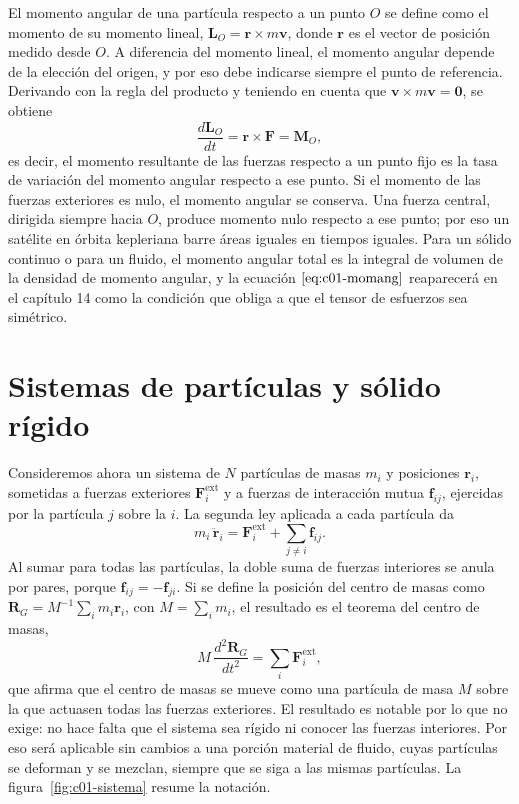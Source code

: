 \documentclass[10pt,openany]{book}
\begin{document}
El momento angular de una partícula respecto a un punto \(O\) se define como el momento de su momento lineal, \(\mathbf{L}_O = \mathbf{r}\times m\mathbf{v}\), donde \(\mathbf{r}\) es el vector de posición medido desde \(O\). A diferencia del momento lineal, el momento angular depende de la elección del origen, y por eso debe indicarse siempre el punto de referencia. Derivando con la regla del producto y teniendo en cuenta que \(\mathbf{v}\times m\mathbf{v} = \mathbf{0}\), se obtiene
\begin{equation}
\frac{d\mathbf{L}_O}{dt} = \mathbf{r}\times\mathbf{F} = \mathbf{M}_O, \label{eq:c01-momang}
\end{equation}
es decir, el momento resultante de las fuerzas respecto a un punto fijo es la tasa de variación del momento angular respecto a ese punto. Si el momento de las fuerzas exteriores es nulo, el momento angular se conserva. Una fuerza central, dirigida siempre hacia \(O\), produce momento nulo respecto a ese punto; por eso un satélite en órbita kepleriana barre áreas iguales en tiempos iguales. Para un sólido continuo o para un fluido, el momento angular total es la integral de volumen de la densidad de momento angular, y la ecuación \(\eqref{eq:c01-momang}\) reaparecerá en el capítulo 14 como la condición que obliga a que el tensor de esfuerzos sea simétrico.

\section{Sistemas de partículas y sólido rígido}

Consideremos ahora un sistema de \(N\) partículas de masas \(m_i\) y posiciones \(\mathbf{r}_i\), sometidas a fuerzas exteriores \(\mathbf{F}_i^{\mathrm{ext}}\) y a fuerzas de interacción mutua \(\mathbf{f}_{ij}\), ejercidas por la partícula \(j\) sobre la \(i\). La segunda ley aplicada a cada partícula da
\begin{equation}
m_i\,\ddot{\mathbf{r}}_i = \mathbf{F}_i^{\mathrm{ext}} + \sum_{j\neq i}\mathbf{f}_{ij}. \label{eq:c01-particula}
\end{equation}
Al sumar para todas las partículas, la doble suma de fuerzas interiores se anula por pares, porque \(\mathbf{f}_{ij} = -\mathbf{f}_{ji}\). Si se define la posición del centro de masas como \(\mathbf{R}_G = M^{-1}\sum_i m_i\mathbf{r}_i\), con \(M = \sum_i m_i\), el resultado es el teorema del centro de masas,
\begin{equation}
M\,\frac{d^{2}\mathbf{R}_G}{dt^{2}} = \sum_i \mathbf{F}_i^{\mathrm{ext}}, \label{eq:c01-tcm}
\end{equation}
que afirma que el centro de masas se mueve como una partícula de masa \(M\) sobre la que actuasen todas las fuerzas exteriores. El resultado es notable por lo que no exige: no hace falta que el sistema sea rígido ni conocer las fuerzas interiores. Por eso será aplicable sin cambios a una porción material de fluido, cuyas partículas se deforman y se mezclan, siempre que se siga a las mismas partículas. La figura~\ref{fig:c01-sistema} resume la notación.
\end{document}
